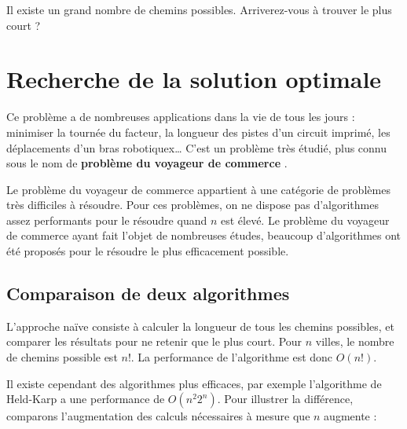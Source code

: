 \documentclass[a5paper,pagesize,DIV=14]{scrbook}
\begin{document}

Il existe un grand nombre de chemins possibles. Arriverez-vous à trouver le plus court ?

\newpage

\section*{Recherche de la solution optimale}

Ce problème a de nombreuses applications dans la vie de tous les jours :
minimiser la tournée du facteur, la longueur des pistes d'un circuit imprimé,
les déplacements d'un bras robotiquex{\ldots} C'est un problème très étudié, plus connu sous le nom de \textbf{\og problème du voyageur de commerce \fg}.

Le problème du voyageur de commerce appartient à une catégorie de problèmes très difficiles à résoudre. Pour ces problèmes, on ne dispose pas d'algorithmes assez performants pour le résoudre quand $n$ est élevé. Le problème du voyageur de commerce ayant fait l'objet de nombreuses études, beaucoup d'algorithmes ont été proposés pour le résoudre le plus efficacement possible.

\subsection*{Comparaison de deux algorithmes}

L'approche naïve consiste à calculer la longueur de tous les chemins possibles, et comparer les résultats pour ne retenir que le plus court. Pour $n$ villes, le nombre de chemins possible est $n!$. La performance de l'algorithme est donc $O(n!)$.

Il existe cependant des algorithmes plus efficaces, par exemple l'algorithme de Held-Karp a une performance de $O(n^{2}2^n)$. Pour illustrer la différence, comparons l'augmentation des calculs nécessaires à mesure que $n$ augmente :
\end{document}
